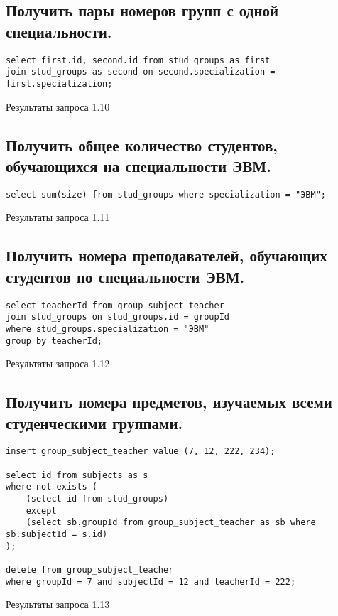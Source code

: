 \documentclass[a4paper,8pt]{article}
\begin{document}
\subsection{Получить пары номеров групп с одной специальности.}
\begin{verbatim}
select first.id, second.id from stud_groups as first
join stud_groups as second on second.specialization = first.specialization;
\end{verbatim}
\begin{table}[H]
\centering

\caption{Результаты запроса 1.10}
\end{table}

\subsection{Получить общее количество студентов, обучающихся на специальности ЭВМ.}
\begin{verbatim}
select sum(size) from stud_groups where specialization = "ЭВМ";
\end{verbatim}
\begin{table}[H]
\centering

\caption{Результаты запроса 1.11}
\end{table}

\subsection{Получить номера преподавателей, обучающих студентов по специальности ЭВМ.}
\begin{verbatim}
select teacherId from group_subject_teacher
join stud_groups on stud_groups.id = groupId
where stud_groups.specialization = "ЭВМ"
group by teacherId;
\end{verbatim}
\begin{table}[H]
\centering

\caption{Результаты запроса 1.12}
\end{table}

\subsection{Получить номера предметов, изучаемых всеми студенческими группами.}
\begin{verbatim}
insert group_subject_teacher value (7, 12, 222, 234);

select id from subjects as s
where not exists (
	(select id from stud_groups)
    except 
    (select sb.groupId from group_subject_teacher as sb where sb.subjectId = s.id) 
);

delete from group_subject_teacher 
where groupId = 7 and subjectId = 12 and teacherId = 222;
\end{verbatim}
\begin{table}[H]
\centering

\caption{Результаты запроса 1.13}
\end{table}
\end{document}

